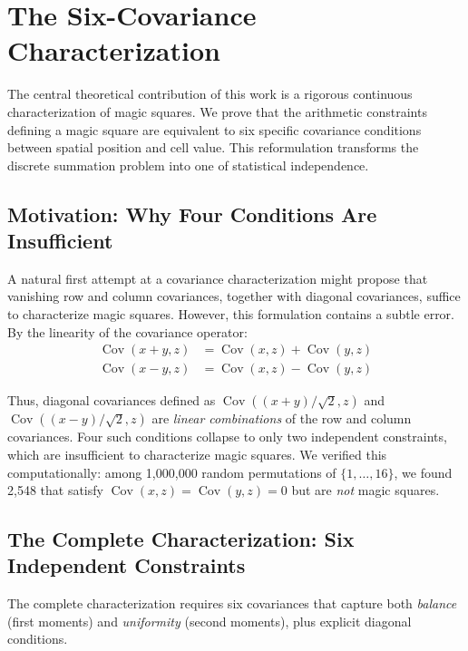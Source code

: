 \section{The Six-Covariance Characterization}\label{sec:covariance-proof}

The central theoretical contribution of this work is a rigorous continuous characterization of magic squares. We prove that the arithmetic constraints defining a magic square are equivalent to six specific covariance conditions between spatial position and cell value. This reformulation transforms the discrete summation problem into one of statistical independence.

\subsection{Motivation: Why Four Conditions Are Insufficient}

A natural first attempt at a covariance characterization might propose that vanishing row and column covariances, together with diagonal covariances, suffice to characterize magic squares. However, this formulation contains a subtle error. By the linearity of the covariance operator:
\begin{align}
\operatorname{Cov}(x + y, z) &= \operatorname{Cov}(x, z) + \operatorname{Cov}(y, z)\\
\operatorname{Cov}(x - y, z) &= \operatorname{Cov}(x, z) - \operatorname{Cov}(y, z)
\end{align}

Thus, diagonal covariances defined as $\operatorname{Cov}((x+y)/\sqrt{2}, z)$ and $\operatorname{Cov}((x-y)/\sqrt{2}, z)$ are \textit{linear combinations} of the row and column covariances. Four such conditions collapse to only two independent constraints, which are insufficient to characterize magic squares. We verified this computationally: among 1,000,000 random permutations of $\{1, \ldots, 16\}$, we found 2,548 that satisfy $\operatorname{Cov}(x, z) = \operatorname{Cov}(y, z) = 0$ but are \textit{not} magic squares.

\subsection{The Complete Characterization: Six Independent Constraints}

The complete characterization requires six covariances that capture both \textit{balance} (first moments) and \textit{uniformity} (second moments), plus explicit diagonal conditions.

